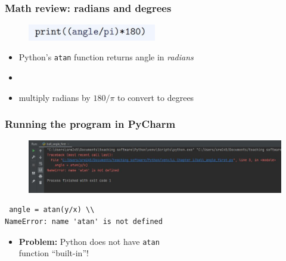 \documentclass[14pt]{beamer}
\begin{document}

\begin{frame}[fragile]
\frametitle{Math review: radians and degrees}

\begin{figure}[ht]
	\centering
	\includegraphics[width=0.5\textwidth]{figures/LLp12b}
\end{figure}

\begin{itemize}
\item Python's \texttt{atan} function returns angle in \emph{radians}
\item[]
\item multiply radians by $180/\pi$ to convert to degrees
\end{itemize}
\end{frame}


\begin{frame}[fragile]
\frametitle{Running the program in PyCharm}

\begin{figure}[ht]
	\centering
	\includegraphics[width=\textwidth]{figures/LLp12output}
\end{figure}

\begin{verbatim}
 angle = atan(y/x) \\
NameError: name 'atan' is not defined
\end{verbatim}

\begin{itemize}
\item \textbf{Problem:} Python does not have \texttt{atan} \\ \qquad\qquad\quad function ``built-in''!
\end{itemize}

\end{frame}

\end{document}
